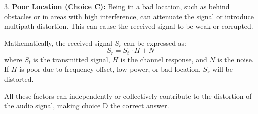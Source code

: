 3. \textbf{Poor Location (Choice C):} Being in a bad location, such as behind obstacles or in areas with high interference, can attenuate the signal or introduce multipath distortion. This can cause the received signal to be weak or corrupted.

Mathematically, the received signal \( S_r \) can be expressed as:
\[ S_r = S_t \cdot H + N \]
where \( S_t \) is the transmitted signal, \( H \) is the channel response, and \( N \) is the noise. If \( H \) is poor due to frequency offset, low power, or bad location, \( S_r \) will be distorted.

All these factors can independently or collectively contribute to the distortion of the audio signal, making choice D the correct answer.

